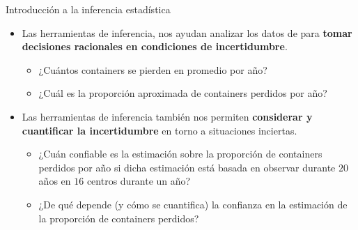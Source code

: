 \documentclass{beamer}
\theoremstyle{definition}
\begin{document}



\begin{frame}{\color{rosee}Introducci\'on a la inferencia estadística}
\small
  \begin{itemize}
\item Las herramientas de inferencia, nos ayudan analizar los datos de para \textbf{tomar decisiones racionales en condiciones de incertidumbre}.\medskip
  \begin{itemize}
  \item ¿Cuántos containers se pierden en promedio por año?
  \item ¿Cuál es la proporción aproximada de containers perdidos por año?

  \end{itemize}
\item Las herramientas de inferencia también nos permiten\textbf{ considerar y cuantificar la incertidumbre} en torno a situaciones inciertas.\medskip
  \begin{itemize}
  \item ¿Cu\'an confiable es la estimaci\'on sobre la proporción de
    containers perdidos por año si dicha estimación está basada en observar durante $20$ años en $16$ centros durante un año?\\
    
  \item ¿De qué depende (y cómo se cuantifica) la confianza en la estimación de la proporción de containers perdidos?
 
  \end{itemize}
    \end{itemize}
\end{frame}
\end{document}
